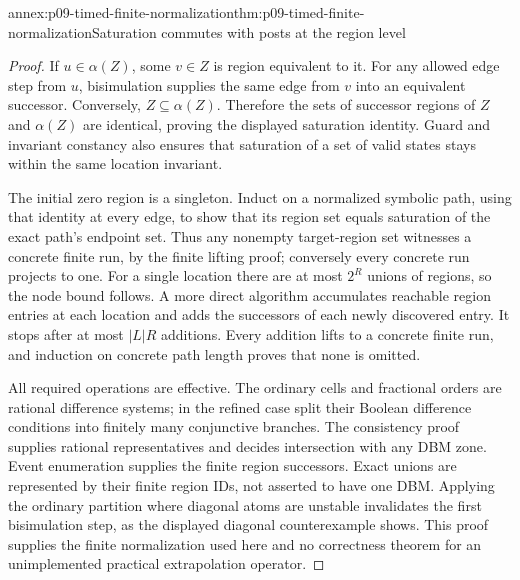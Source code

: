 \begin{annexitem}{annex:p09-timed-finite-normalization}{thm:p09-timed-finite-normalization}{Saturation commutes with posts at the region level}
\begin{proof}
If \(u\in\alpha(Z)\), some \(v\in Z\) is region equivalent to it.
For any allowed edge step from \(u\), bisimulation supplies the same
edge from \(v\) into an equivalent successor. Conversely, \(Z\subseteq
\alpha(Z)\). Therefore the sets of successor regions of \(Z\) and
\(\alpha(Z)\) are identical, proving the displayed saturation identity.
Guard and invariant constancy also ensures that saturation of a set of
valid states stays within the same location invariant.

The initial zero region is a singleton. Induct on a normalized symbolic
path, using that identity at every edge, to show that its region set
equals saturation of the exact path's endpoint set. Thus any nonempty
target-region set witnesses a concrete finite run, by the finite lifting
proof; conversely every concrete run projects to one. For a single
location there are at most \(2^R\) unions of regions, so the node bound
follows. A more direct algorithm accumulates reachable region entries at
each location and adds the successors of each newly discovered entry.
It stops after at most \(|L|R\) additions. Every addition lifts to a
concrete finite run, and induction on concrete path length proves that
none is omitted.

All required operations are effective. The ordinary cells and fractional
orders are rational difference systems; in the refined case split their
Boolean difference conditions into finitely many conjunctive branches.
The consistency proof supplies rational representatives and decides
intersection with any DBM zone. Event enumeration supplies the finite
region successors. Exact unions are represented by their finite region
IDs, not asserted to have one DBM. Applying the ordinary partition where
diagonal atoms are unstable invalidates the first bisimulation step, as
the displayed diagonal counterexample shows. This proof supplies the
finite normalization used here and no correctness theorem for an
unimplemented practical extrapolation operator.
\end{proof}
\end{annexitem}
